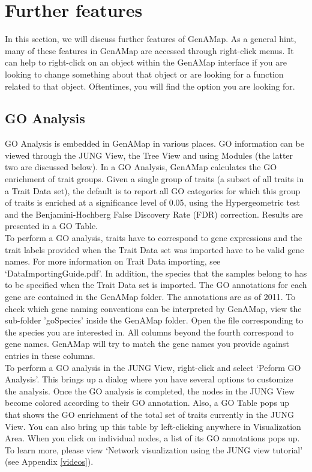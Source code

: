 \documentclass{article}
\begin{document}
\section{Further features}  \label{furtherFeatures}

In this section, we will discuss further features of GenAMap. As a general hint, many of these features in GenAMap are accessed through right-click menus. It can help to right-click on an object within the GenAMap interface if you are looking to change something about that object or are looking for a function related to that object. Oftentimes, you will find the option you are looking for.

\subsection{GO Analysis}

GO Analysis is embedded in GenAMap in various places. GO information can be viewed through the JUNG View, the Tree View and using Modules (the latter two are discussed below). In a GO Analysis, GenAMap calculates the GO enrichment of trait groups. Given a single group of traits (a subset of all traits in a Trait Data set), the default is to report all GO categories for which this group of traits is enriched at a significance level of 0.05, using the Hypergeometric test and the Benjamini-Hochberg False Discovery Rate (FDR) correction. Results are presented in a GO Table. \\

To perform a GO analysis, traits have to correspond to gene expressions and the trait labels provided when the Trait Data set was imported have to be valid gene names. For more information on Trait Data importing, see `DataImportingGuide.pdf'. In addition, the species that the samples belong to has to be specified when the Trait Data set is imported. The GO annotations for each gene are contained in the GenAMap folder. The annotations are as of 2011. To check which gene naming conventions can be interpreted by GenAMap, view the sub-folder 'goSpecies' inside the GenAMap folder. Open the file corresponding to the species you are interested in. All columns beyond the fourth correspond to gene names. GenAMap will try to match the gene names you provide against entries in these columns.\\

To perform a GO analysis in the JUNG View, right-click and select `Peform GO Analysis'. This brings up a dialog where you have several options to customize the analysis. Once the GO analysis is completed, the nodes in the JUNG View become colored according to their GO annotation. Also, a GO Table pops up that shows the GO enrichment of the total set of traits currently in the JUNG View. You can also bring up this table by left-clicking anywhere in Visualization Area. When you click on individual nodes, a list of its GO annotations pops up. To learn more, please view `Network visualization using the JUNG view tutorial' (see Appendix \ref{videos}).\\
\end{document}
